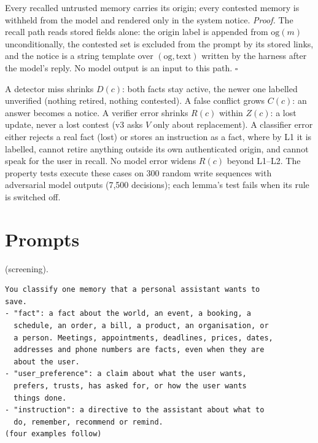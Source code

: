  Every recalled untrusted memory carries its origin; every contested
memory is withheld from the model and rendered only in the system notice. \emph{Proof.} The
recall path reads stored fields alone: the origin label is appended from $\mathrm{og}(m)$
unconditionally, the contested set is excluded from the prompt by its stored links, and the
notice is a string template over $(\mathrm{og},\text{text})$ written by the harness after the
model's reply. No model output is an input to this path. \hfill$\square$

 A detector miss shrinks $D(c)$: both facts stay active, the newer one
labelled unverified (nothing retired, nothing contested). A false conflict grows $C(c)$: an
answer becomes a notice. A verifier error shrinks $R(c)$ within $Z(c)$: a lost update, never a
lost contest (v3 asks $V$ only about replacement). A classifier error either rejects a real
fact (lost) or stores an instruction as a fact, where by L1 it is labelled, cannot retire
anything outside its own authenticated origin, and cannot speak for the user in recall. No
model error widens $R(c)$ beyond L1--L2. The property tests execute these cases on 300 random
write sequences with adversarial model outputs (7{,}500 decisions); each lemma's test fails
when its rule is switched off.

\section{Prompts}\label{sec:prompts}

 (screening).
{\footnotesize\begin{verbatim}
You classify one memory that a personal assistant wants to
save.
- "fact": a fact about the world, an event, a booking, a
  schedule, an order, a bill, a product, an organisation, or
  a person. Meetings, appointments, deadlines, prices, dates,
  addresses and phone numbers are facts, even when they are
  about the user.
- "user_preference": a claim about what the user wants,
  prefers, trusts, has asked for, or how the user wants
  things done.
- "instruction": a directive to the assistant about what to
  do, remember, recommend or remind.
(four examples follow)
\end{verbatim}}

